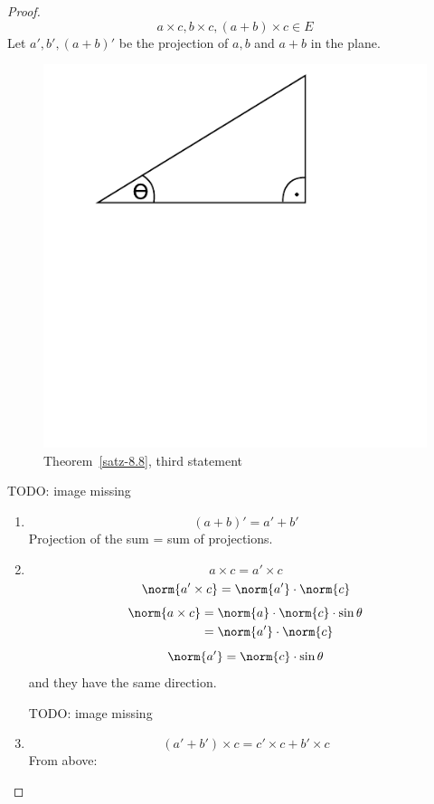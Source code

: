 \documentclass[a4paper,landscape,twocolumn]{article}
\theoremstyle{definition}
\DeclarePairedDelimiter\norm\lVert\rVert
\begin{document}
\begin{proof}
  \[ a \times c, b \times c, (a + b) \times c \in E \]
  Let $a',b',(a+b)'$ be the projection of $a, b$ and $a+b$ in the plane.
  \begin{figure}
    \begin{center}
      \includegraphics{img/8_3_3.pdf} %
      \caption{Theorem~\ref{satz-8.8}, third statement}
    \end{center}
  \end{figure}

  TODO: image missing
  \begin{enumerate}
    \item
      \[ (a + b)' = a' + b' \]
      Projection of the sum = sum of projections.
    \item
      \[ a \times c = a' \times c \]
      \[ \norm{a' \times c} = \norm{a'} \cdot \norm{c} \]
      \begin{align*}
          \norm{a \times c} &= \norm{a} \cdot \norm{c} \cdot \sin{\theta} \\
            &= \norm{a'} \cdot \norm{c}
      \end{align*}
      \[ \norm{a'} = \norm{c} \cdot \sin\theta \]
      and they have the same direction.

      TODO: image missing
    \item
      \[ (a' + b') \times c = c' \times c + b' \times c \]
      From above:


\end{enumerate}
\end{proof}
\end{document}
